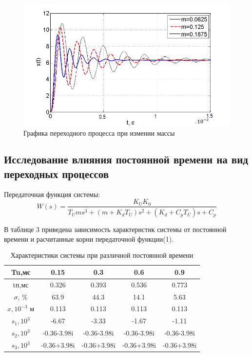 \documentclass[a4paper, 12pt]{article}
\renewcommand{\arraystretch}{1.5}
\begin{document}
\begin{figure}[h]
	\centering
	\includegraphics[width=0.9\linewidth]{12}
	\caption{Графика переходного процесса при измении массы}
	\label{fig:5}
\end{figure}
\newpage


\begin{center}
	\section{Исследование влияния постоянной времени на вид переходных процессов}
\end{center}

Передаточная функция системы:\\
\begin{equation}
W(s)=\frac{K_UK_0}{T_Ums^3+(m+K_dT_U)s^2+(K_d+C_pT_U)s+C_p}
\end{equation}\par
В таблице 3 приведена зависимость характеристик системы от постоянной времени и расчитанные корни передаточной функции(1). 
  
\begin{table}[h!]
	\begin{threeparttable}
\caption{Характеристики системы при различной постоянной времени  }
\renewcommand{\arraystretch}{1}
\renewcommand{\tabcolsep}{0.75cm}
\begin{tabular}{|c|c|c|c|c|}
	\hline
	Tu,мс	&	0.15	&	0.3	&	0.6	&	0.9	\\
	\hline
	tп,мс	&	0.326	&	0.393	&	0.536	&	0.773	\\
	\hline
	$\sigma$, \%	&	63.9	&	44.3	&	14.1	&	5.63	\\
	\hline
	$x,10^{-3} \text{ м}$	&	0.113	&	0.113	&	0.113	&	0.113	\\
	\hline
	$s_1, 10^{3}$	&	-6.67	&	-3.33	&	-1.67	&	-1.11	\\
	\hline
	$s_2, 10^{3}$	&	-0.36-3.98i	&	-0.36-3.98i	&	-0.36-3.98i	&	-0.36-3.98i	\\
	\hline
	$s_3, 10^{3}$	&	-0.36+3.98i	&	-0.36+3.98i	&	-0.36+3.98i	&	-0.36+3.98i	\\
	\hline
\end{tabular}
\end{threeparttable}
\end{table}\par
\end{document}
